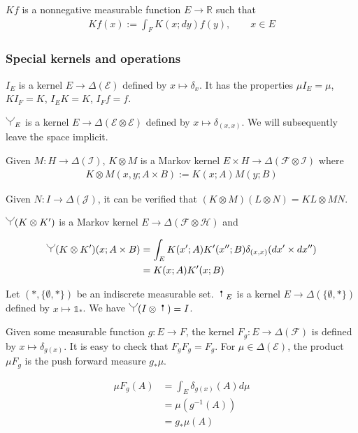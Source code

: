 $Kf$ is a nonnegative measurable function $E\to \mathbb{R}$ such that
\begin{align}
    Kf(x) := \int_F K(x;dy)f(y), \qquad x\in E
\end{align}

\subsubsection{Special kernels and operations}

$I_E$ is a kernel $E\to \Delta(\mathcal{E})$ defined by $x\mapsto \delta_x$. It has the properties $\mu I_E=\mu$, $KI_F = K$, $I_E K = K$, $I_F f=f$.

$\splitter{0.15}_E$ is a kernel $E\to \Delta(\mathcal{E}\otimes\mathcal{E})$ defined by $x\mapsto \delta_{(x,x)}$. We will subsequently leave the space implicit.

Given $M:H\to \Delta(\mathcal{I})$, $K\otimes M$ is a Markov kernel $E\times H\to \Delta(\mathcal{F}\otimes\mathcal{I})$ where
\begin{align}
    K\otimes M(x,y;A\times B) := K(x;A) M(y;B)
\end{align}

Given $N:I\to \Delta(\mathcal{J})$, it can be verified that $(K\otimes M)(L\otimes N)=KL\otimes MN$.

$\splitter{0.15}(K\otimes K')$ is a Markov kernel $E\to \Delta(\mathcal{F}\otimes\mathcal{H})$ and

\begin{align}
    \splitter{0.15}(K\otimes K')(x;A\times B) &= \int_E K(x';A)K'(x'';B) \delta_{(x,x)} (dx'\times dx'')\\ 
                                              &= K(x;A)K'(x;B) \label{eq:outer_product}
\end{align}

Let $(*,\{\emptyset,*\})$ be an indiscrete measurable set. $\stopper{0.15}_E$ is a kernel $E\to \Delta(\{\emptyset,*\})$ defined by $x\mapsto \mathds{1}_*$. We have $\splitter{0.15}(I\otimes \stopper{0.15}) = I$.

Given some measurable function $g:E\to F$, the kernel $F_g:E\to \Delta(\mathcal{F})$ is defined by $x\mapsto \delta_{g(x)}$. It is easy to check that $F_g F_g = F_g$. For $\mu\in \Delta(\mathcal{E})$, the product $\mu F_g$ is the push forward measure $g_*\mu$.

\begin{align}
    \mu F_g (A) &= \int_E \delta_{g(x)}(A) d\mu\\
                &= \mu(g^{-1}(A))\\
                &= g_*\mu(A)
\end{align}

